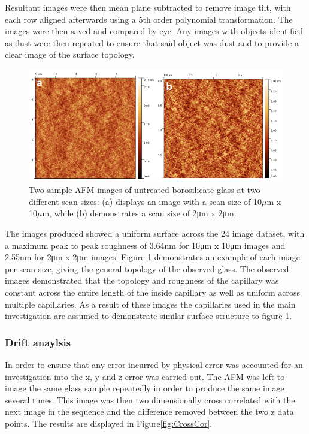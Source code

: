 Resultant images were then mean plane subtracted to remove image tilt, with each row aligned afterwards using a 5th order polynomial transformation. The images were then saved and compared by eye. Any images with objects identified as dust were then repeated to ensure that said object was dust and to provide a clear image of the surface topology.

\begin{figure}[h]     %
        \begin{center}
          \includegraphics[width=120mm]{chapter3/Figure9.png}
\end{center}
\caption{Two sample AFM images of untreated borosilicate glass at two different scan sizes: (a) displays an image with a scan size of 10$\mu$m x 10$\mu$m, while (b) demonstrates a scan size of 2μm x 2μm.}
\label{fig:figure9}                 %
\end{figure}   
  
The images produced showed a uniform surface across the 24 image dataset, with a maximum peak to peak roughness of 3.64nm for 10μm x 10μm images and 2.55nm for 2μm x 2μm images. Figure \ref{fig:figure9} demonstrates an example of each image per scan size, giving the general topology of the observed glass.
The observed images demonstrated that the topology and roughness of the capillary was constant across the entire length of the inside capillary as well as uniform across multiple capillaries. As a result of these images the capillaries used in the main investigation are assumed to demonstrate similar surface structure to figure \ref{fig:figure9}.

\subsubsection{Drift anaylsis}

In order to ensure that any error incurred by physical error was accounted for an investigation into the x, y and z error was carried out. The AFM was left to image the same glass sample repeatedly in order to produce the same image several times. This image was then two dimensionally cross correlated with the next image in the sequence and the difference removed between the two z data points. The results are displayed in Figure\ref{fig:CrossCor}.

